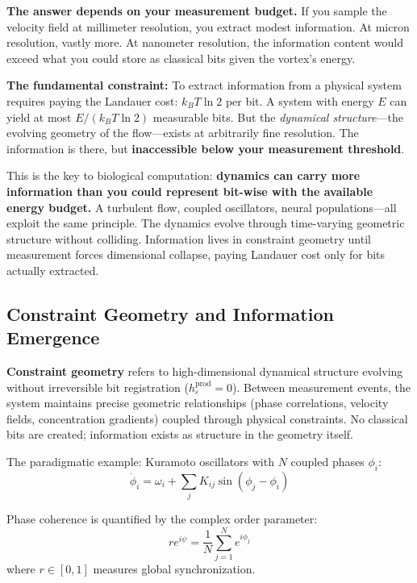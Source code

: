 \documentclass[12pt]{article}
\begin{document}
\textbf{The answer depends on your measurement budget.} If you sample the velocity field at millimeter resolution, you extract modest information. At micron resolution, vastly more. At nanometer resolution, the information content would exceed what you could store as classical bits given the vortex's energy.

\textbf{The fundamental constraint:} To extract information from a physical system requires paying the Landauer cost: $k_B T \ln 2$ per bit. A system with energy $E$ can yield at most $E/(k_B T \ln 2)$ measurable bits. But the \textit{dynamical structure}—the evolving geometry of the flow—exists at arbitrarily fine resolution. The information is there, but \textbf{inaccessible below your measurement threshold}.

This is the key to biological computation: \textbf{dynamics can carry more information than you could represent bit-wise with the available energy budget.} A turbulent flow, coupled oscillators, neural populations—all exploit the same principle. The dynamics evolve through time-varying geometric structure without colliding. Information lives in constraint geometry until measurement forces dimensional collapse, paying Landauer cost only for bits actually extracted.

\subsection{Constraint Geometry and Information Emergence}

\textbf{Constraint geometry} refers to high-dimensional dynamical structure evolving without irreversible bit registration ($h_\varepsilon^{\text{prod}} = 0$). Between measurement events, the system maintains precise geometric relationships (phase correlations, velocity fields, concentration gradients) coupled through physical constraints. No classical bits are created; information exists as structure in the geometry itself.

The paradigmatic example: Kuramoto oscillators with $N$ coupled phases $\phi_i$:
\begin{equation}
\dot{\phi}_i = \omega_i + \sum_j K_{ij} \sin(\phi_j - \phi_i)
\end{equation}

Phase coherence is quantified by the complex order parameter:
\begin{equation}
r e^{i\psi} = \frac{1}{N}\sum_{j=1}^N e^{i\phi_j}
\end{equation}
where $r \in [0,1]$ measures global synchronization.
\end{document}

